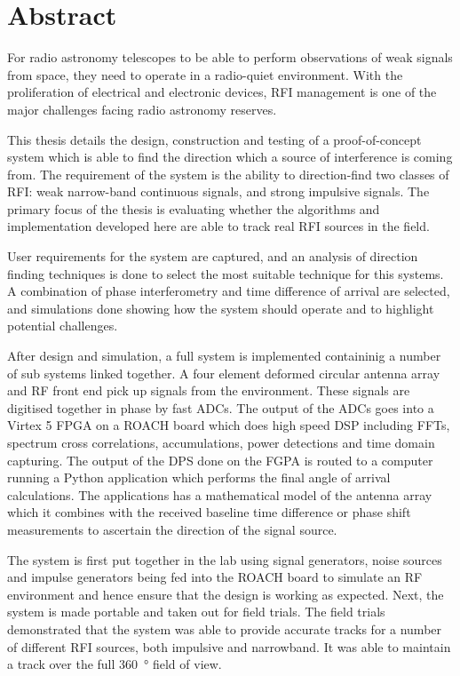\chapter{Abstract}

For radio astronomy telescopes to be able to perform observations of weak signals from space, they need to operate in a radio-quiet environment. With the proliferation of electrical and electronic devices, RFI management is one of the major challenges facing radio astronomy reserves. 

This thesis details the design, construction and testing of a proof-of-concept system which is able to find the direction which a source of interference is coming from. The requirement of the system is the ability to direction-find two classes of RFI: weak narrow-band continuous signals, and strong impulsive signals. The primary focus of the thesis is evaluating whether the algorithms and implementation developed here are able to track real RFI sources in the field.

User requirements for the system are captured, and an analysis of direction finding techniques is done to select the most suitable technique for this systems. A combination of phase interferometry and time difference of arrival are selected, and simulations done showing how the system should operate and to highlight potential challenges.

After design and simulation, a full system is implemented containinig a number of sub systems linked together. A four element deformed circular antenna array and RF front end pick up signals from the environment. These signals are digitised together in phase by fast ADCs. The output of the ADCs goes into a Virtex 5 FPGA on a ROACH board which does high speed DSP including FFTs, spectrum cross correlations, accumulations, power detections and time domain capturing. The output of the DPS done on the FGPA is routed to a computer running a Python application which performs the final angle of arrival calculations. The applications has a mathematical model of the antenna array which it combines with the received baseline time difference or phase shift measurements to ascertain the direction of the signal source.

The system is first put together in the lab using signal generators, noise sources and impulse generators being fed into the ROACH board to simulate an RF environment and hence ensure that the design is working as expected. Next, the system is made portable and taken out for field trials. The field trials demonstrated that the system was able to provide accurate tracks for a number of different RFI sources, both impulsive and narrowband. It was able to maintain a track over the full \SI{360}{\degree} field of view.

